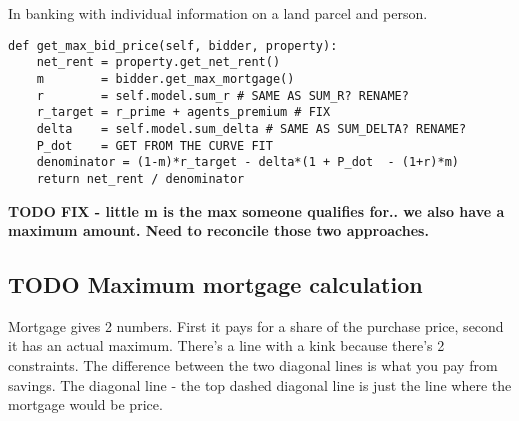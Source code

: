 In banking with individual information on a land parcel and person.
\begin{lstlisting}
def get_max_bid_price(self, bidder, property):
    net_rent = property.get_net_rent()
    m        = bidder.get_max_mortgage()
    r        = self.model.sum_r # SAME AS SUM_R? RENAME?
    r_target = r_prime + agents_premium # FIX
    delta    = self.model.sum_delta # SAME AS SUM_DELTA? RENAME?
    P_dot    = GET FROM THE CURVE FIT
    denominator = (1-m)*r_target - delta*(1 + P_dot  - (1+r)*m)
    return net_rent / denominator   
\end{lstlisting}

\textbf{TODO FIX - little m is the max someone qualifies for.. we also have a maximum amount. Need to reconcile those two approaches.}
 
\subsection{TODO Maximum mortgage calculation}


Mortgage gives 2 numbers. First it pays for a share of the purchase price, second it has an actual maximum. There's a line with a kink because there's 2 constraints.  The difference between the two diagonal lines is what you pay from savings. 
The diagonal line - the top dashed diagonal line is just the line where the mortgage would be price.

